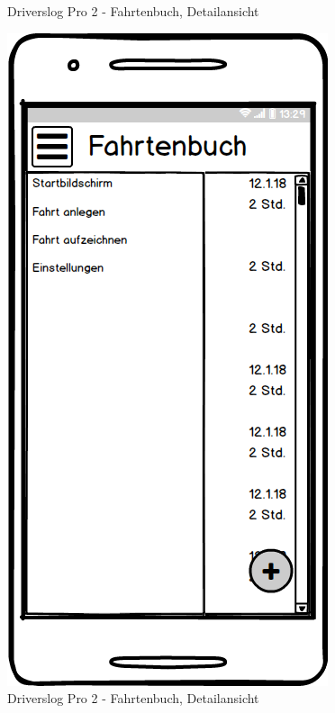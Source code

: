 \documentclass[a4paper]{article}
\begin{document}
\begin{figure}
\begin{minipage}[b]{0.3\textwidth}
        \caption{\label{img:img/mock2}Driverslog Pro 2 - Fahrtenbuch, Detailansicht}
    \end{minipage}
    \hspace{0.025\textwidth}%
	\begin{minipage}[b]{0.3\textwidth}
		\includegraphics[width=\textwidth]{img/mock3}
        \caption{\label{img:img/mock3}Driverslog Pro 2 - Fahrtenbuch, Detailansicht}
	\end{minipage}
\end{figure}
\end{document}
